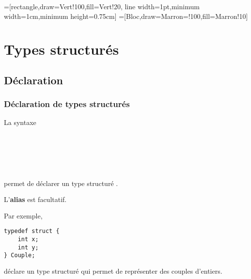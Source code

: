 
=[rectangle,draw=Vert!100,fill=Vert!20,
    line width=1pt,minimum width=1cm,minimum height=0.75cm]
=[Bloc,draw=Marron=!100,fill=Marron!10]

\section{Types structurés}

\subsection{Déclaration}

\begin{frame}[fragile]
\frametitle{Déclaration de types structurés}
La syntaxe
\smallskip

 \\
\qquad {} \\
\qquad {} \\
\qquad \Code{\dots} \\
\smallskip

permet de \alert{déclarer un type structuré} .
\bigskip

L'{\bf alias}  est facultatif.
\bigskip

Par exemple, \vspace{-1em}
\begin{multicols}{2}
\begin{lstlisting}
typedef struct {
    int x;
    int y;
} Couple;
\end{lstlisting}
déclare un type structuré  qui permet de représenter des
couples d'entiers.
\end{multicols}
\end{frame}

